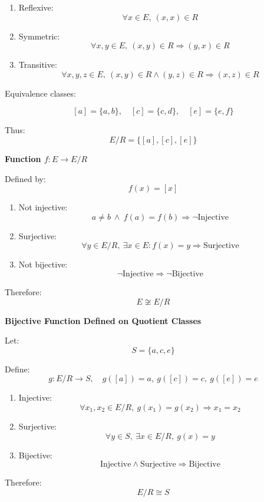 \documentclass[12pt,a4paper,openany]{article}
\begin{document}
\begin{enumerate}
\item Reflexive:
$$
\forall x \in E,\ (x,x) \in R
$$

\item Symmetric:
$$
\forall x,y \in E,\ (x,y) \in R \Rightarrow (y,x) \in R
$$

\item Transitive:
$$
\forall x,y,z \in E,\ (x,y) \in R \wedge (y,z) \in R \Rightarrow (x,z) \in R
$$
\end{enumerate}

Equivalence classes:

$$
[a] = \{a,b\}, \quad [c] = \{c,d\}, \quad [e] = \{e,f\}
$$

Thus:
$$
E/R = \{[a], [c], [e]\}
$$

\textbf{Function $f: E \to E/R$}

Defined by:
$$
f(x) = [x]
$$

\begin{enumerate}
\item Not injective:
$$
a \ne b \ \wedge\ f(a) = f(b) \Rightarrow \neg \text{Injective}
$$

\item Surjective:
$$
\forall y \in E/R,\ \exists x \in E: f(x) = y \Rightarrow \text{Surjective}
$$

\item Not bijective:
$$
\neg \text{Injective} \Rightarrow \neg \text{Bijective}
$$
\end{enumerate}

Therefore:
$$
E \not\cong E/R
$$

\textbf{Bijective Function Defined on Quotient Classes}

Let:
$$
S = \{a,c,e\}
$$

Define:
$$
g: E/R \to S,\quad g([a]) = a,\ g([c]) = c,\ g([e]) = e
$$

\begin{enumerate}
\item Injective:
$$
\forall x_1,x_2 \in E/R,\ g(x_1) = g(x_2) \Rightarrow x_1 = x_2
$$

\item Surjective:
$$
\forall y \in S,\ \exists x \in E/R,\ g(x) = y
$$

\item Bijective:
$$
\text{Injective} \wedge \text{Surjective} \Rightarrow \text{Bijective}
$$
\end{enumerate}

Therefore:
$$
E/R \cong S
$$
\end{document}
